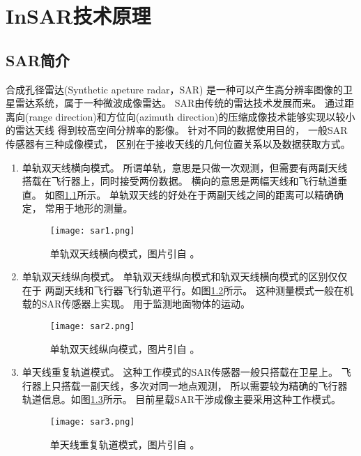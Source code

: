 \chapter{InSAR技术原理}

\section{SAR简介}

合成孔径雷达(Synthetic apeture radar，SAR)
是一种可以产生高分辨率图像的卫星雷达系统，属于一种微波成像雷达。
SAR由传统的雷达技术发展而来。
通过距离向(range direction)和方位向(azimuth direction)的压缩成像技术能够实现以较小的雷达天线
得到较高空间分辨率的影像。
针对不同的数据使用目的，
一般SAR传感器有三种成像模式，
区别在于接收天线的几何位置关系以及数据获取方式。
\begin{enumerate}
    \item 单轨双天线横向模式。
    所谓单轨，意思是只做一次观测，但需要有两副天线搭载在飞行器上，同时接受两份数据。
    横向的意思是两幅天线和飞行轨道垂直。
    如图\ref{fig:sar1}所示。
    单轨双天线的好处在于两副天线之间的距离可以精确确定，
    常用于地形的测量。
    \begin{figure}[htp]
        \centering
        \texttt{[image: sar1.png]}
        \caption{单轨双天线横向模式，图片引自
        。}
        \label{fig:sar1}
    \end{figure}
    \item 单轨双天线纵向模式。
    单轨双天线纵向模式和轨双天线横向模式的区别仅仅在于
    两副天线和飞行器飞行轨道平行。如图\ref{fig:sar2}所示。
    这种测量模式一般在机载的SAR传感器上实现。
    用于监测地面物体的运动。
    \begin{figure}[htb]
        \centering
        \texttt{[image: sar2.png]}
        \caption{单轨双天线纵向模式，图片引自
        。}
        \label{fig:sar2}
    \end{figure}
    \item 单天线重复轨道模式。
    这种工作模式的SAR传感器一般只搭载在卫星上。
    飞行器上只搭载一副天线，多次对同一地点观测，
    所以需要较为精确的飞行器轨道信息。如图\ref{fig:sar3}所示。
    目前星载SAR干涉成像主要采用这种工作模式。
    \begin{figure}[htb]
        \centering
        \texttt{[image: sar3.png]}
        \caption{单天线重复轨道模式，图片引自
        。}
        \label{fig:sar3}
    \end{figure}
\end{enumerate}
